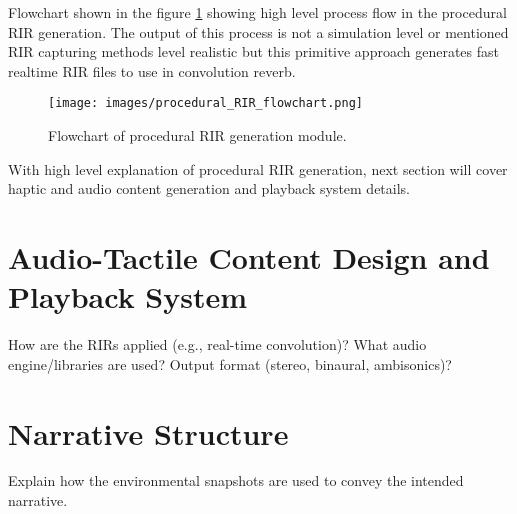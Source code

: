         Flowchart shown in the figure \ref{fig:FLOW} showing high level process flow in the procedural RIR generation. The output of this process is not a simulation level or mentioned RIR capturing methods level realistic but this primitive approach generates fast realtime RIR files to use in convolution reverb.\par
        
        \begin{figure}[H]
            \centering
            \texttt{[image: images/procedural\_RIR\_flowchart.png]}
            \caption{Flowchart of procedural RIR generation module.}
            \label{fig:FLOW}
        \end{figure}

        With high level explanation of procedural RIR generation, next section will cover haptic and audio content generation and playback system details.\par
    \section{Audio-Tactile Content Design and Playback System} How are the RIRs applied (e.g., real-time convolution)? What audio engine/libraries are used? Output format (stereo, binaural, ambisonics)?
    \section{Narrative Structure} Explain how the environmental snapshots are used to convey the intended narrative.